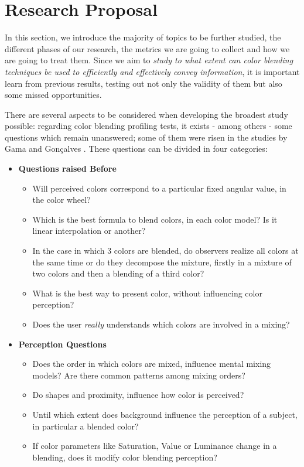 \documentclass{report}
\begin{document}
\chapter{Research Proposal}

In this section, we introduce the majority of topics to be further studied, the different phases of our research, the metrics we are going to collect
and how we are going to treat them. Since we aim to \emph{study to what extent can color blending techniques be used to efficiently and effectively
convey information}, it is important learn from previous results, testing out not only the validity of them but also some missed opportunities. \par
There are several aspects to be considered when developing the broadest study possible: regarding color blending profiling tests, it exists - among
others - some questions which remain unanswered; some of them were risen in the studies by Gama and Gonçalves \cite{Gama20141,Gama20142}. These questions can be divided in four categories:
%
\begin{itemize}
	\setlength\itemsep{0.1em}
	\item \textbf{Questions raised Before}
    \begin{itemize}
    	\setlength\itemsep{0.1em}
		\item Will perceived colors correspond to a particular fixed angular value, in the color wheel?
        \item Which is the best formula to blend colors, in each color model? Is it linear interpolation or another?
        \item In the case in which 3 colors are blended, do observers realize all colors at the same time or do they decompose the mixture, firstly in a mixture of two colors and then a blending of a third color?
        \item What is the best way to present color, without influencing color perception?
        \item Does the user \emph{really} understands which colors are involved in a mixing?
	\end{itemize}
    \item \textbf{Perception Questions}
    \begin{itemize}
    	\setlength\itemsep{0.1em}
    	\item Does the order in which colors are mixed, influence mental mixing models? Are there common patterns among mixing orders?
        \item Do shapes and proximity, influence how color is perceived?
        \item Until which extent does background influence the perception of a subject, in particular a blended color?
        \item If color parameters like Saturation, Value or Luminance change in a blending, does it modify color blending perception?
    \end{itemize}
\end{itemize}
\end{document}
